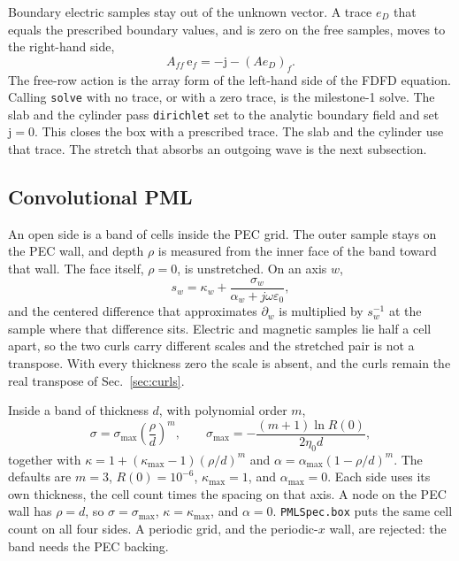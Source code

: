 \documentclass[11pt,a4paper]{article}
\begin{document}
Boundary electric samples stay out of the unknown vector. A trace $e_D$
that equals the prescribed boundary values, and is zero on the free
samples, moves to the right-hand side,
\begin{equation}
A_{ff}\,\mathrm{e}_f = -\mathrm{j} - (A e_D)_f.
\label{eq:dirichlet}
\end{equation}
The free-row action is the array form of the left-hand side of the FDFD
equation. Calling \texttt{solve} with no trace, or with a zero trace, is
the milestone-1 solve. The slab and the cylinder pass \texttt{dirichlet}
set to the analytic boundary field and set $\mathrm{j}=0$. This closes the
box with a prescribed trace. The slab and the cylinder use that trace.
The stretch that absorbs an outgoing wave is the next subsection.

\subsection{Convolutional PML}
\label{sec:pml}

An open side is a band of cells inside the PEC grid. The outer sample stays
on the PEC wall, and depth $\rho$ is measured from the inner face of the
band toward that wall. The face itself, $\rho=0$, is unstretched. On an
axis $w$,
\begin{equation}
s_w = \kappa_w + \frac{\sigma_w}{\alpha_w + j\omega\varepsilon_0},
\label{eq:pml-s}
\end{equation}
and the centered difference that approximates $\partial_w$ is multiplied by
$s_w^{-1}$ at the sample where that difference sits. Electric and magnetic
samples lie half a cell apart, so the two curls carry different scales and
the stretched pair is not a transpose. With every thickness zero the scale
is absent, and the curls remain the real transpose of Sec.~\ref{sec:curls}.

Inside a band of thickness $d$, with polynomial order $m$,
\begin{equation}
\sigma = \sigma_{\max}\left(\frac{\rho}{d}\right)^m,
\qquad
\sigma_{\max} = -\frac{(m+1)\ln R(0)}{2\eta_0 d},
\label{eq:pml-sigma}
\end{equation}
together with $\kappa=1+(\kappa_{\max}-1)(\rho/d)^m$ and
$\alpha=\alpha_{\max}(1-\rho/d)^m$. The defaults are $m=3$,
$R(0)=10^{-6}$, $\kappa_{\max}=1$, and $\alpha_{\max}=0$. Each side uses
its own thickness, the cell count times the spacing on that axis. A node on the PEC wall has $\rho=d$, so $\sigma=\sigma_{\max}$,
$\kappa=\kappa_{\max}$, and $\alpha=0$. \texttt{PMLSpec.box} puts the same
cell count on all four sides. A periodic grid, and the periodic-$x$ wall,
are rejected: the band needs the PEC backing.
\end{document}
